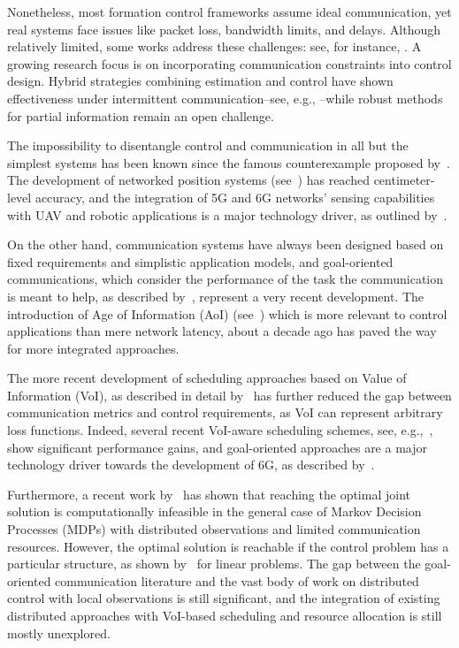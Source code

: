 \documentclass{ifac/ifacconf}
\begin{document}
Nonetheless, most formation control frameworks assume ideal communication, yet real systems face issues like packet loss, bandwidth limits, and delays. Although relatively limited, some works address these challenges: see, for instance,  \cite{cepeda2016stability,hoff2024communication}. A growing research focus is on incorporating communication constraints into control design. Hybrid strategies combining estimation and control have shown effectiveness under intermittent communication--see, e.g., \cite{bartels2016robust,zhao2020vehicle}--while robust methods for partial information remain an open challenge.

The impossibility to disentangle control and communication in all but the simplest systems has been known since the famous counterexample proposed by~\cite{witsenhausen1968counterexample}. The development of networked position systems (see~\cite{yang2024positioning}) has reached centimeter-level accuracy, and the integration of 5G and 6G networks' sensing capabilities with UAV and robotic applications is a major technology driver, as outlined by~\cite{fan2024air}.


On the other hand, communication systems have always been designed based on fixed requirements and simplistic application models, and goal-oriented communications, which consider the performance of the task the communication is meant to help, as described by~\cite{gunduz2022beyond}, represent a very recent development. The introduction of Age of Information (AoI) (see~\cite{yates2021age}) which is more relevant to control applications than mere network latency, about a decade ago has paved the way for more integrated approaches. 

The more recent development of scheduling approaches based on Value of Information (VoI), as described in detail by~\cite{alawad2022value} has further reduced the gap between communication metrics and control requirements, as VoI can represent arbitrary loss functions. Indeed, several recent VoI-aware scheduling schemes, see, e.g.,~\cite{holm2023goal,wang2024value}, show significant performance gains, and goal-oriented approaches are a major technology driver towards the development of 6G, as described by~\cite{gunduz2023timely}.

Furthermore, a recent work by~\cite{talli2025pragmatic} has shown that reaching the optimal joint solution is computationally infeasible in the general case of Markov Decision Processes (MDPs) with distributed observations and limited communication resources. However, the optimal solution is reachable if the control problem has a particular structure, as shown by~\cite{zheng2020urgency} for linear problems.
The gap between the goal-oriented communication literature and the vast body of work on distributed control with local observations is still significant, and the integration of existing distributed approaches with VoI-based scheduling and resource allocation is still mostly unexplored.
\end{document}

